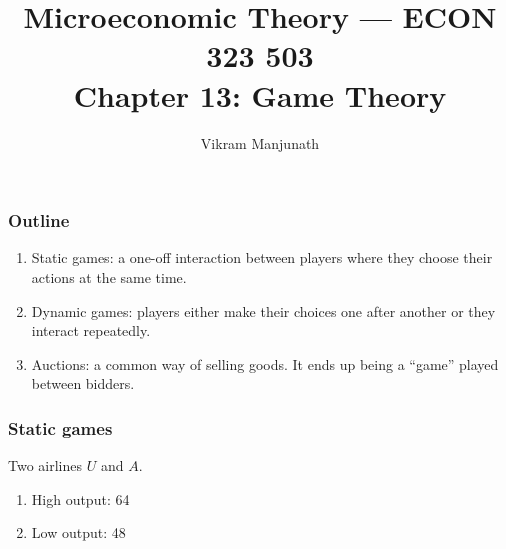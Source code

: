 \documentclass[xcolor=pdftex,dvipsnames]{beamer}
\title{Microeconomic Theory --- ECON 323 503 \\ Chapter 13: Game Theory}
\author{Vikram Manjunath}       %
\institute{Texas A\&M University}
\begin{document}
\maketitle

\begin{frame}
\frametitle{Outline}
\begin{enumerate}[<+->]
\item  Static games: a one-off interaction between players where they choose their actions at the same time.
\item Dynamic games: players either make their choices one after another or they interact repeatedly.
\item Auctions: a common way of selling goods. It ends up being a ``game'' played between bidders.
\end{enumerate}
\end{frame}


\begin{frame}
  \frametitle{Static games}  
  Two airlines $U$ and $A$.

  \bigskip
{}

  \bigskip
{}
  \begin{enumerate}
  \item<4-> High output: 64

  \item<5-> Low output: 48
  \end{enumerate}

  \end{frame}
\end{document}
